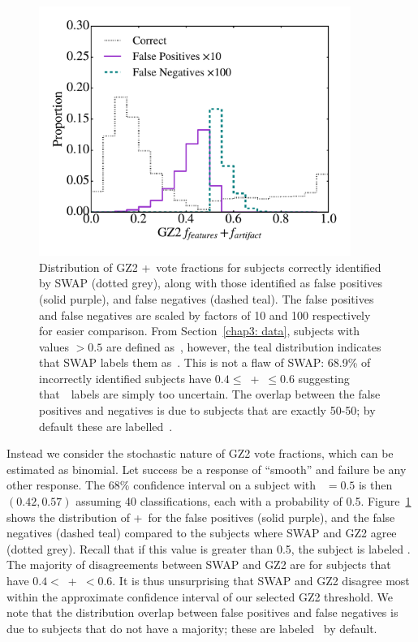 \begin{figure}
\centering
\includegraphics[width=4in]{Figures/human_machine/f8.pdf}
\caption[SWAP's prediction disagrees with the GZ2 label as a result of the confidence interval around the chosen threshold used to define the GZ2 label.]{Distribution of GZ2 \ffeat+\fstar~vote fractions for subjects correctly identified by SWAP (dotted grey), along with those identified as false positives (solid purple), and false negatives (dashed teal). 
The false positives and false negatives are scaled by factors of 10 and 100 respectively for easier comparison. From Section~\ref{chap3: data}, subjects with values $> 0.5$ are defined as~\feat, however, the teal distribution indicates that SWAP labels them as~\notfeat. This is not a flaw of SWAP: 68.9\% of incorrectly identified subjects have $0.4 \le $~\ffeat +\fstar~$ \le 0.6$ suggesting that~\raw~labels are simply too uncertain. The overlap between the false positives and negatives is due to subjects that are exactly 50-50; by default these are labelled~\notfeat.}
\label{fig: SWAP sucks}
\end{figure}

Instead we consider the stochastic nature of GZ2 vote fractions, which can be estimated as binomial. Let success be a response of ``smooth'' and failure be any other response. The $68\%$ confidence interval on a subject with \fsmooth~$=0.5$ is then $(0.42, 0.57)$ assuming 40 classifications, each with a probability of 0.5. Figure~\ref{fig: SWAP sucks} shows the distribution of \ffeat+\fstar~for the false positives (solid purple), and the false negatives (dashed teal) compared to the  subjects where SWAP and GZ2 agree (dotted grey).  Recall that if this value is greater than 0.5, the subject is labeled \feat. The majority of disagreements between SWAP and GZ2 are for subjects that have $0.4 <$~\ffeat+\fstar~$< 0.6$. It is thus unsurprising that SWAP and GZ2 disagree most within the approximate confidence interval of our selected GZ2 threshold. We note that the distribution overlap between false positives and false negatives is due to subjects that do not have a majority; these are labeled \notfeat~by default. 


